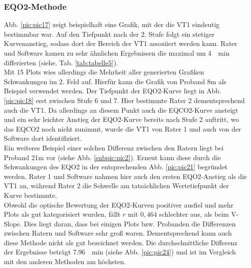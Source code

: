 \subsubsection{\gls{EQO2}-Methode}
%
Abb. \ref{pic:pic17} zeigt beispielhaft eine Grafik, mit der die VT1 eindeutig bestimmbar war. Auf den Tiefpunkt nach der 2. Stufe folgt ein stetiger Kurvenanstieg, sodass dort der Bereich der VT1 assoziiert werden kann. Rater und Software kamen zu sehr ähnlichen Ergebnissen die maximal um \SI{4}{\per\minute} differierten (siehe. Tab. \ref{tab:tabelle5}).\\
Mit 15 Plots wies allerdings die Mehrheit aller generierten Grafiken Schwankungen im 2. Feld auf. Hierfür kann die Grafik von Proband 8m als Beispiel verwendet werden. Der Tiefpunkt der \gls{EQO2}-Kurve liegt in Abb. \ref{pic:pic18} erst zwischen Stufe 6 und 7. Hier bestimmte Rater 2 dementsprechend auch die VT1. Da allerdings an diesem Punkt auch die \gls{EQCO2}-Kurve ansteigt und ein sehr leichter Anstieg der \gls{EQO2}-Kurve bereits nach Stufe 2 auftritt, wo das \gls{EQCO2} noch nicht zunimmt, wurde die VT1 von Rater 1 und auch von der Software dort identifiziert.\\
Ein weiteres Beispiel einer solchen Differenz zwischen den Ratern liegt bei Proband 21m vor (siehe Abb. \ref{subpic:pic2}). Erneut kann diese durch die Schwankungen des \gls{EQO2} in der entsprechenden Abb. \ref{pic:pic21} begründet werden. Rater 1 und Software nahmen hier auch den ersten \gls{EQO2}-Anstieg als die VT1 an, während Rater 2 die Schwelle am tatsächlichen Wertetiefpunkt der Kurve bestimmte.\\
Obwohl die optische Bewertung der \gls{EQO2}-Kurven positiver ausfiel und mehr Plots als gut kategorisiert wurden, fällt $r$ mit $0,464$ schlechter aus, als beim V-Slope. Dies liegt daran, dass bei einigen Plots bzw. Probanden die Differenzen zwischen Ratern und Software sehr groß waren. Dementsprechend kann auch diese Methode nicht als gut bezeichnet werden. Die durchschnittliche Differenz der Ergebnisse beträgt \SI{7,96}{\per\minute} (siehe Abb. \ref{pic:pic24}) und ist im Vergleich mit den anderen Methoden am höchsten.
%
